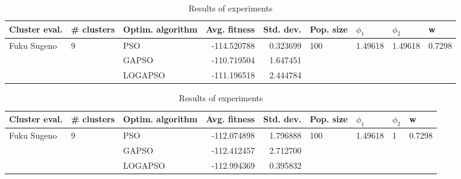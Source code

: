 \documentclass{article}
\begin{document}
\begin{table}
\centering
\caption{Results of experiments}
\begin{tabular}{lllrrllll}
\toprule
               Cluster eval. &        \# clusters & Optim. algorithm &  Avg. fitness &  Std. dev. &            Pop. size &               $\phi_{1}$ &               $\phi_{2}$ &                       w \\
\midrule
\multirow{3}{*}{Fuku Sugeno} & \multirow{3}{*}{9} &              PSO &   -114.520788 &   0.323699 & \multirow{3}{*}{100} & \multirow{3}{*}{1.49618} & \multirow{3}{*}{1.49618} & \multirow{3}{*}{0.7298} \\
                             &                    &            GAPSO &   -110.719504 &   1.647451 &                      &                          &                          &                         \\
                             &                    &          LOGAPSO &   -111.196518 &   2.444784 &                      &                          &                          &                         \\
\bottomrule
\end{tabular}
\end{table}
\begin{table}
\centering
\caption{Results of experiments}
\begin{tabular}{lllrrllll}
\toprule
               Cluster eval. &        \# clusters & Optim. algorithm &  Avg. fitness &  Std. dev. &            Pop. size &               $\phi_{1}$ &         $\phi_{2}$ &                       w \\
\midrule
\multirow{3}{*}{Fuku Sugeno} & \multirow{3}{*}{9} &              PSO &   -112.074898 &   1.796888 & \multirow{3}{*}{100} & \multirow{3}{*}{1.49618} & \multirow{3}{*}{1} & \multirow{3}{*}{0.7298} \\
                             &                    &            GAPSO &   -112.412457 &   2.712700 &                      &                          &                    &                         \\
                             &                    &          LOGAPSO &   -112.994369 &   0.395832 &                      &                          &                    &                         \\
\bottomrule
\end{tabular}
\end{table}
\end{document}
